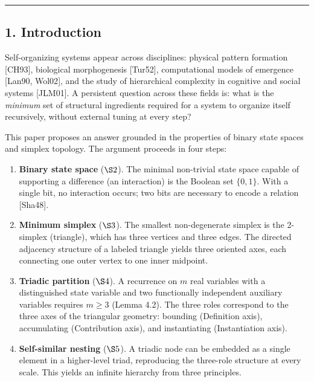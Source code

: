 \documentclass[
  11pt,
  letterpaper,
]{article}
\providecommand{\tightlist}{%
  \setlength{\itemsep}{0pt}\setlength{\parskip}{0pt}}
\begin{document}
\begin{center}\rule{0.5\linewidth}{0.5pt}\end{center}

\subsection{1. Introduction}\label{introduction}

Self-organizing systems appear across disciplines: physical pattern
formation {[}CH93{]}, biological morphogenesis {[}Tur52{]},
computational models of emergence {[}Lan90, Wol02{]}, and the study of
hierarchical complexity in cognitive and social systems {[}JLM01{]}. A
persistent question across these fields is: what is the \emph{minimum}
set of structural ingredients required for a system to organize itself
recursively, without external tuning at every step?

This paper proposes an answer grounded in the properties of binary state
spaces and simplex topology. The argument proceeds in four steps:

\begin{enumerate}
\def\labelenumi{\arabic{enumi}.}
\tightlist
\item
  \textbf{Binary state space} (\(\S 2\)). The minimal non-trivial state
  space capable of supporting a difference (an interaction) is the
  Boolean set \(\{0, 1\}\). With a single bit, no interaction occurs;
  two bits are necessary to encode a relation {[}Sha48{]}.
\item
  \textbf{Minimum simplex} (\(\S 3\)). The smallest non-degenerate
  simplex is the 2-simplex (triangle), which has three vertices and
  three edges. The directed adjacency structure of a labeled triangle
  yields three oriented axes, each connecting one outer vertex to one
  inner midpoint.
\item
  \textbf{Triadic partition} (\(\S 4\)). A recurrence on \(m\) real
  variables with a distinguished state variable and two functionally
  independent auxiliary variables requires \(m \ge 3\) (Lemma 4.2). The
  three roles correspond to the three axes of the triangular geometry:
  bounding (Definition axis), accumulating (Contribution axis), and
  instantiating (Instantiation axis).
\item
  \textbf{Self-similar nesting} (\(\S 5\)). A triadic node can be
  embedded as a single element in a higher-level triad, reproducing the
  three-role structure at every scale. This yields an infinite hierarchy
  from three principles.
\end{enumerate}
\end{document}
